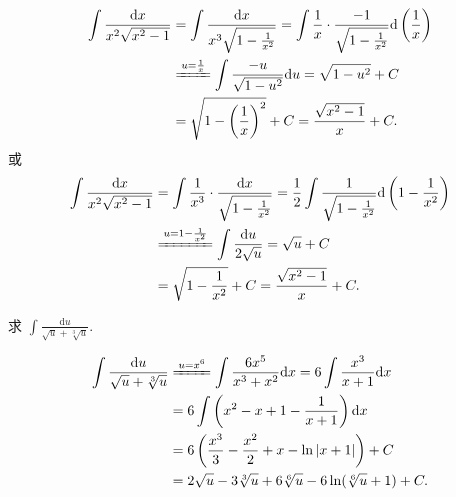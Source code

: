 \begin{solution}[解法 2]
\begin{align*}
\int\frac{\mathrm{d}x}{x^{2}\sqrt{x^{2}-1}}&=\int\frac{\mathrm{d}x}{x^{3}\sqrt{1-\frac{1}{x^{2}}}}
=\int\frac{1}{x}\cdot\frac{-1}{\sqrt{1-\frac{1}{x^{2}}}}\mathrm{d}\left(\frac{1}{x}\right)\\
&\xlongequal{u=\frac{1}{x}}\int\frac{-u}{\sqrt{1-u^{2}}}\mathrm{d}u=\sqrt{1-u^{2}}+C\\
&=\sqrt{1-\left(\frac{1}{x}\right)^{2}}+C=\frac{\sqrt{x^{2}-1}}{x}+C.
\end{align*}
或
\begin{align*}
\int\frac{\mathrm{d}x}{x^{2}\sqrt{x^{2}-1}}&=\int\frac{1}{x^{3}}\cdot\frac{\mathrm{d}x}{\sqrt{1-\frac{1}{x^{2}}}}
=\frac{1}{2}\int\frac{1}{\sqrt{1-\frac{1}{x^{2}}}}\mathrm{d}\left(1-\frac{1}{x^{2}}\right)\\
&\xlongequal{u=1-\frac{1}{x^{2}}}\int\frac{\mathrm{d}u}{2\sqrt{u}}=\sqrt{u}+C\\
&=\sqrt{1-\frac{1}{x^{2}}}+C=\frac{\sqrt{x^{2}-1}}{x}+C.
\end{align*}
\end{solution}

\begin{figure}[htbp]
\centering
{}
\caption{}\label{fig:5.2.6}
\end{figure}

\begin{example}\label{ex:5.2.9}
求 $\int\frac{\mathrm{d}u}{\sqrt{u}+\sqrt[3]{u}}$.
\end{example}

\begin{solution}
\begin{align*}
\int\frac{\mathrm{d}u}{\sqrt{u}+\sqrt[3]{u}}&\xlongequal{u=x^{6}}\int\frac{6x^{5}}{x^{3}+x^{2}}\mathrm{d}x
=6\int\frac{x^{3}}{x+1}\mathrm{d}x\\
&=6\int\left(x^{2}-x+1-\frac{1}{x+1}\right)\mathrm{d}x\\
&=6\left(\frac{x^{3}}{3}-\frac{x^{2}}{2}+x-\ln|x+1|\right)+C\\
&=2\sqrt{u}-3\sqrt[3]{u}+6\sqrt[6]{u}-6\ln(\sqrt[6]{u}+1)+C.
\end{align*}
\end{solution}

